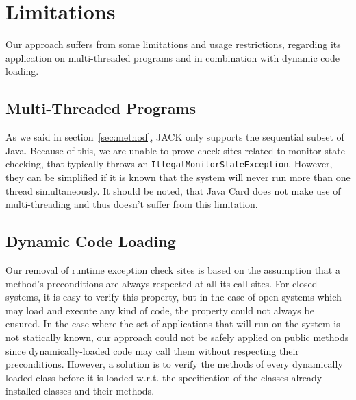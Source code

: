 

\section{Limitations}
\label{sec:limitations}

Our approach suffers from some limitations and usage restrictions, regarding its application on multi-threaded programs and in combination with dynamic code loading.

\subsection{Multi-Threaded Programs}

As we said in section~\ref{sec:method}, JACK only supports the sequential subset of Java. Because of this, we are unable to prove check sites related to monitor state checking, that typically throws an \texttt{IllegalMonitorStateException}. However, they can be simplified if it is known that the system will never run more than one thread simultaneously. It should be noted, that Java Card does not make use of multi-threading and thus doesn't suffer from this limitation.

\subsection{Dynamic Code Loading}

Our removal of runtime exception check sites is based on the assumption that a method's preconditions are always respected at all its call sites.
 For closed systems, it is easy to verify this property, but in the case of open systems which may load and execute any kind of code, the property
 could not always be ensured. In the case where the set of applications that will run on the system is not statically known, our approach
 could not be safely applied on public methods since dynamically-loaded code may call them without respecting their preconditions. However, a solution
 is to verify the methods of every dynamically loaded class before it is loaded w.r.t. the specification of the classes already installed classes and their methods. 

